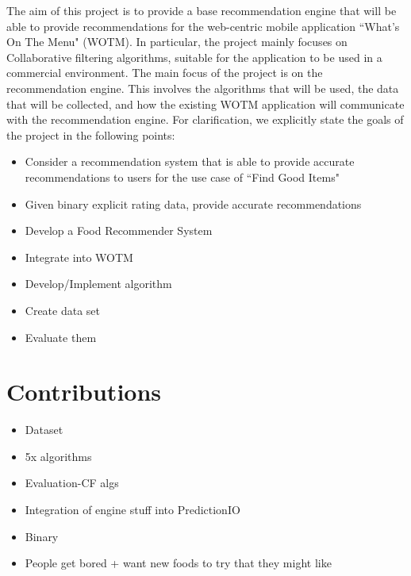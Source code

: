 The aim of this project is to provide a base recommendation engine that will be able to provide recommendations for the web-centric mobile application ``What's On The Menu" (WOTM). In particular, the project mainly focuses on Collaborative filtering algorithms, suitable for the application to be used in a commercial environment. The main focus of the project is on the recommendation engine. This involves the algorithms that will be used, the data that will be collected, and how the existing WOTM application will communicate with the recommendation engine. 
For clarification, we explicitly state the goals of the project in the following points:
\begin{itemize}
	\item{Consider a recommendation system that is able to provide accurate recommendations to users for the use case of ``Find Good Items"}
	\item{Given binary explicit rating data, provide accurate recommendations}
	\item{Develop a Food Recommender System}
	\item{Integrate into WOTM}
	\item{Develop/Implement algorithm}
	\item{Create data set}
	\item{Evaluate them}
\end{itemize}



\section{Contributions}
\begin{itemize}
	\item{Dataset}
	\item{5x algorithms}
	\item{Evaluation-CF algs}
	\item{Integration of engine stuff into PredictionIO}
	\item{Binary}
	\item{People get bored + want new foods to try that they might like}
\end{itemize}